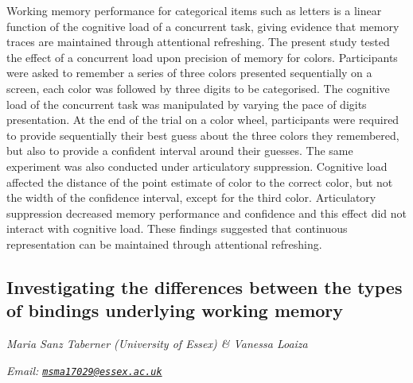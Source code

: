 \documentclass[
  12pt,
]{book}
\begin{document}
Working memory performance for categorical items such as letters is a linear function of the cognitive load of a concurrent task, giving evidence that memory traces are maintained through attentional refreshing. The present study tested the effect of a concurrent load upon precision of memory for colors. Participants were asked to remember a series of three colors presented sequentially on a screen, each color was followed by three digits to be categorised. The cognitive load of the concurrent task was manipulated by varying the pace of digits presentation. At the end of the trial on a color wheel, participants were required to provide sequentially their best guess about the three colors they remembered, but also to provide a confident interval around their guesses. The same experiment was also conducted under articulatory suppression. Cognitive load affected the distance of the point estimate of color to the correct color, but not the width of the confidence interval, except for the third color. Articulatory suppression decreased memory performance and confidence and this effect did not interact with cognitive load. These findings suggested that continuous representation can be maintained through attentional refreshing.

\hypertarget{investigating-the-differences-between-the-types-of-bindings-underlying-working-memory}{%
\subsection{Investigating the differences between the types of bindings underlying working memory}\label{investigating-the-differences-between-the-types-of-bindings-underlying-working-memory}}

\emph{Maria Sanz Taberner (University of Essex) \& Vanessa Loaiza}

\emph{Email: \href{mailto:msma17029@essex.ac.uk}{\nolinkurl{msma17029@essex.ac.uk}}}
\end{document}
